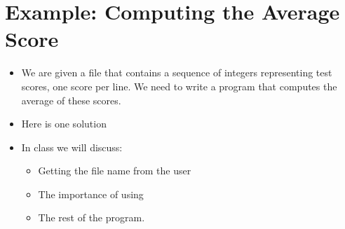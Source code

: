\documentclass[letterpaper,10pt,english]{sphinxmanual}
\begin{document}
\section{Example: Computing the Average Score}
\label{\detokenize{lecture_notes/lec13_files_web:example-computing-the-average-score}}\begin{itemize}
\item {} 
We are given a file that contains a sequence of integers
representing test scores, one score per line.  We need to write a
program that computes the average of these scores.

\item {} 
Here is one solution

%
\begin{sphinxVerbatim}[commandchars=\\\{\}]
  
      

  
  
   
      
      

    
\end{sphinxVerbatim}

\item {} 
In class we will discuss:
\begin{itemize}
\item {} 
Getting the file name from the user

\item {} 
The importance of using 

\item {} 
The rest of the program.

\end{itemize}

\end{itemize}
\end{document}
